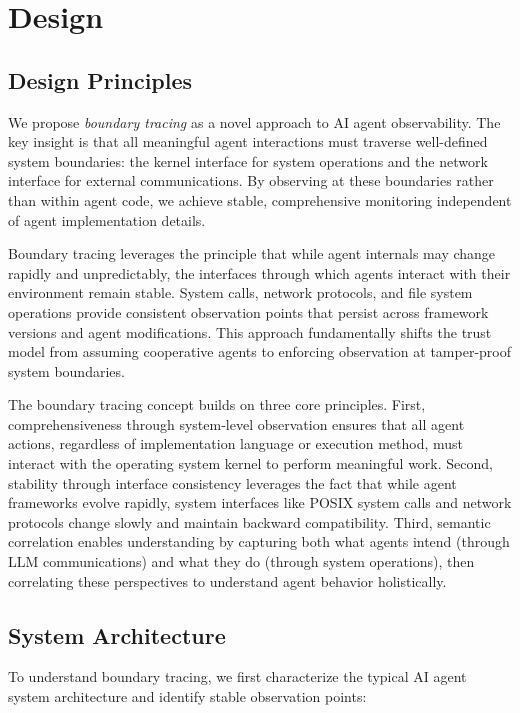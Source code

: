 \section{Design}

\subsection{Design Principles}

We propose \emph{boundary tracing} as a novel approach to AI agent observability. The key insight is that all meaningful agent interactions must traverse well-defined system boundaries: the kernel interface for system operations and the network interface for external communications. By observing at these boundaries rather than within agent code, we achieve stable, comprehensive monitoring independent of agent implementation details.

Boundary tracing leverages the principle that while agent internals may change rapidly and unpredictably, the interfaces through which agents interact with their environment remain stable. System calls, network protocols, and file system operations provide consistent observation points that persist across framework versions and agent modifications. This approach fundamentally shifts the trust model from assuming cooperative agents to enforcing observation at tamper-proof system boundaries.

The boundary tracing concept builds on three core principles. First, comprehensiveness through system-level observation ensures that all agent actions, regardless of implementation language or execution method, must interact with the operating system kernel to perform meaningful work. Second, stability through interface consistency leverages the fact that while agent frameworks evolve rapidly, system interfaces like POSIX system calls and network protocols change slowly and maintain backward compatibility. Third, semantic correlation enables understanding by capturing both what agents intend (through LLM communications) and what they do (through system operations), then correlating these perspectives to understand agent behavior holistically.

\subsection{System Architecture}

To understand boundary tracing, we first characterize the typical AI agent system architecture and identify stable observation points:

